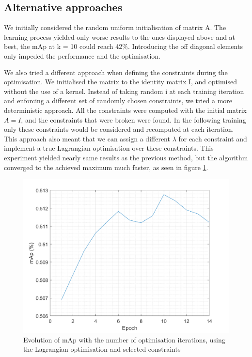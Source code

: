 \documentclass[10pt,technote]{IEEEtran}
\begin{document}
\subsection{Alternative approaches}
We initially considered the random uniform initialisation of matrix A. The learning process yielded only worse results to the ones displayed above and at best, the mAp at k = 10 could reach 42\%. Introducing the off diagonal elements only impeded the performance and the optimisation.

We also tried a different approach when defining the constraints during the optimisation. We initialised the matrix to the identity matrix I, and optimised without the use of a kernel. Instead of taking random i at each training iteration and enforcing a different set of randomly chosen constraints, we tried a more deterministic approach. All the constraints were computed with the initial matrix $A=I$, and the constraints that were broken were found. In the following training only these constraints would be considered and recomputed at each iteration. This approach also meant that we can assign a different $\lambda$ for each constraint and implement a true Lagrangian optimisation over these constraints. This experiment yielded nearly same results as the previous method, but the algorithm converged to the achieved maximum much faster, as seen in figure \ref{fig:Lag_optim}.

\begin{figure}
    \centering
    \includegraphics[width=\linewidth]{Graphs/no_kernel_Maha_I_newloss.png}
    \caption{Evolution of mAp with the number of optimisation iterations, using the Lagrangian optimisation and selected constraints}
    \label{fig:Lag_optim}
\end{figure}
\end{document}

